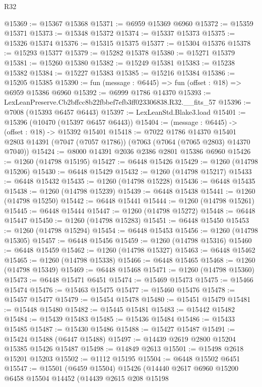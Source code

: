 \begin{lexlean}{R32}
\begin{coremodule}
@15369 := @15367 @15368
@15371 := @6959 @15369 @6960
@15372 := @15359 @15371
@15373 := @15348 @15372
@15374 := @15337 @15373
@15375 := @15326 @15374
@15376 := @15315 @15375
@15377 := @15304 @15376
@15378 := @15293 @15377
@15379 := @15282 @15378
@15380 := @15271 @15379
@15381 := @15260 @15380
@15382 := @15249 @15381
@15383 := @15238 @15382
@15384 := @15227 @15383
@15385 := @15216 @15384
@15386 := @15205 @15385
@15390 := fun (message : @6445) => fun (offset : @18) => @6959 @15386 @6960
@15392 := @6999 @1786 @14370
@15393 := LexLeanPreserve.Cb2bffcc8b22fbbef7efb3ff023306838.R32.__fits_57
@15396 := @7008 (@15393 @6457 @6443)
@15397 := LexLeanStd.Blake3.load
@15401 := @15396 (@10470 (@15397 @6457 @6443))
@15404 := (message : @6445) -> (offset : @18) -> @15392 @15401
@15418 := @7022
    @1786
    @14370
    @15401
    @2803
    @14391
    (@7047 (@7057 @1786))
    (@7063 (@7064 (@7065 @2803) @14370 @7040))
@15424 := @8000 @14391 @2036 @2386 @2801 @15386 @6960
@15426 := @1260 (@14798 @15195)
@15427 := @6448 @15426
@15429 := @1260 (@14798 @15206)
@15430 := @6448 @15429
@15432 := @1260 (@14798 @15217)
@15433 := @6448 @15432
@15435 := @1260 (@14798 @15228)
@15436 := @6448 @15435
@15438 := @1260 (@14798 @15239)
@15439 := @6448 @15438
@15441 := @1260 (@14798 @15250)
@15442 := @6448 @15441
@15444 := @1260 (@14798 @15261)
@15445 := @6448 @15444
@15447 := @1260 (@14798 @15272)
@15448 := @6448 @15447
@15450 := @1260 (@14798 @15283)
@15451 := @6448 @15450
@15453 := @1260 (@14798 @15294)
@15454 := @6448 @15453
@15456 := @1260 (@14798 @15305)
@15457 := @6448 @15456
@15459 := @1260 (@14798 @15316)
@15460 := @6448 @15459
@15462 := @1260 (@14798 @15327)
@15463 := @6448 @15462
@15465 := @1260 (@14798 @15338)
@15466 := @6448 @15465
@15468 := @1260 (@14798 @15349)
@15469 := @6448 @15468
@15471 := @1260 (@14798 @15360)
@15473 := @6448 @15471 @6451
@15474 := @15469 @15473
@15475 := @15466 @15474
@15476 := @15463 @15475
@15477 := @15460 @15476
@15478 := @15457 @15477
@15479 := @15454 @15478
@15480 := @15451 @15479
@15481 := @15448 @15480
@15482 := @15445 @15481
@15483 := @15442 @15482
@15484 := @15439 @15483
@15485 := @15436 @15484
@15486 := @15433 @15485
@15487 := @15430 @15486
@15488 := @15427 @15487
@15491 := @15424 @15488 (@6447 @15488)
@15497 := @14439 @2619 @2800 @15204 @15385 @15426 @15487
@15498 := @14849 @2613
@15501 := @15498 @2618 @15201 @15203
@15502 := @1112 @15195
@15504 := @6448 @15502 @6451
@15547 := @15501
    (@6459 @15504)
    @15426
    (@14440
      @2617
      @6960
      @15200
      @6458
      @15504
      @14452
      (@14439
        @2615
        @208
        @15198

\end{coremodule}
\end{lexlean}

